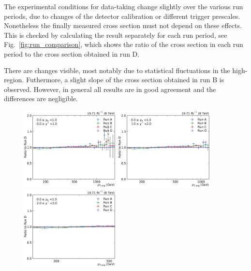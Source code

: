 The experimental conditions for data-taking change slightly over the various run
periods, due to changes of the detector calibration or different trigger
prescales. Nonetheless the finally measured cross section must not depend on
these effects. This is checked by calculating the result separately for each run
period, see Fig.~\ref{fig:run_comparison}, which shows the ratio of the cross
section in each run period to the cross section obtained in run D. 

There are changes visible, most notably due to statistical fluctuations in the
high-\pt region. Futhermore, a slight slope of the cross section obtained in run
B is observed. However, in general all results are in good agreement and the
differences are negligible.

\begin{figure}[htbp]
    \centering
    \includegraphics[width=0.45\textwidth]{figures/measurement/run_comparison_yb0ys0.pdf}\hfill
    \includegraphics[width=0.45\textwidth]{figures/measurement/run_comparison_yb0ys1.pdf}
    \includegraphics[width=0.45\textwidth]{figures/measurement/run_comparison_yb0ys2.pdf}\hfill

\end{figure}
